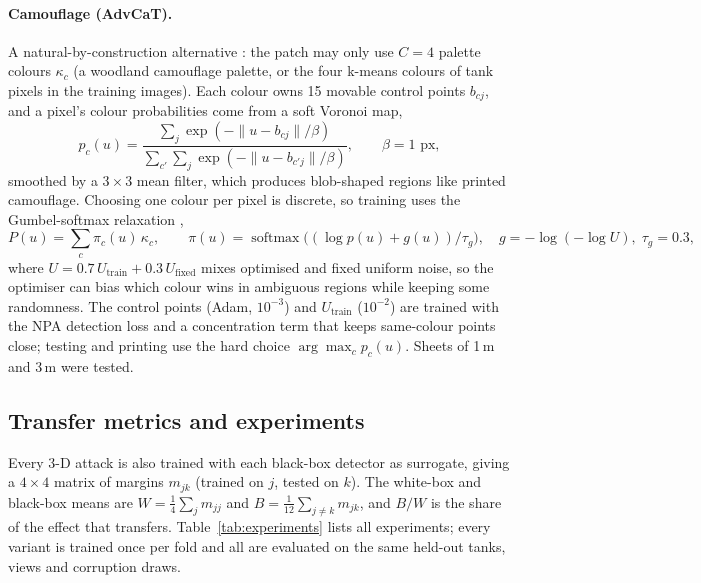 \documentclass[11pt,a4paper]{article}
\begin{document}
\paragraph{Camouflage (AdvCaT).} A natural-by-construction alternative \cite{hu2023advcat}: the patch may only use $C=4$ palette colours $\kappa_c$ (a woodland camouflage palette, or the four k-means colours of tank pixels in the training images). Each colour owns 15 movable control points $b_{cj}$, and a pixel's colour probabilities come from a soft Voronoi map,
\begin{equation}
p_c(u)=\frac{\sum_j\exp(-\lVert u-b_{cj}\rVert/\beta)}{\sum_{c'}\sum_j\exp(-\lVert u-b_{c'j}\rVert/\beta)},\qquad\beta=1\text{ px},
\end{equation}
smoothed by a $3\times3$ mean filter, which produces blob-shaped regions like printed camouflage. Choosing one colour per pixel is discrete, so training uses the Gumbel-softmax relaxation \cite{jang2017gumbel},
\begin{equation}
P(u)=\sum_c\pi_c(u)\,\kappa_c,\qquad\pi(u)=\operatorname{softmax}\big((\log p(u)+g(u))/\tau_g\big),\quad g=-\log(-\log U),\;\tau_g=0.3,
\end{equation}
where $U=0.7\,U_{\text{train}}+0.3\,U_{\text{fixed}}$ mixes optimised and fixed uniform noise, so the optimiser can bias which colour wins in ambiguous regions while keeping some randomness. The control points (Adam, $10^{-3}$) and $U_{\text{train}}$ ($10^{-2}$) are trained with the NPA detection loss and a concentration term that keeps same-colour points close; testing and printing use the hard choice $\arg\max_c p_c(u)$. Sheets of 1\,m and 3\,m were tested.

\subsection{Transfer metrics and experiments}
Every 3-D attack is also trained with each black-box detector as surrogate, giving a $4\times4$ matrix of margins $m_{jk}$ (trained on $j$, tested on $k$). The white-box and black-box means are $W=\frac14\sum_j m_{jj}$ and $B=\frac1{12}\sum_{j\ne k}m_{jk}$, and $B/W$ is the share of the effect that transfers. Table~\ref{tab:experiments} lists all experiments; every variant is trained once per fold and all are evaluated on the same held-out tanks, views and corruption draws.
\end{document}

